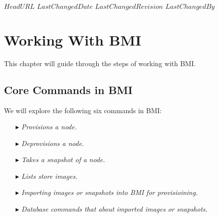 \svnidlong
{$HeadURL$}
{$LastChangedDate$}
{$LastChangedRevision$}
{$LastChangedBy$}

\chapter{Working With BMI}

\begin{introduction}
  This chapter will guide through the steps of working with BMI.
\end{introduction}

\section{Core Commands in BMI}

We will explore the following six commands in BMI: \\

\begin{itemize}
\item[\index{bmi pro}\code{pro }$\blacktriangleright$\hspace{-12mm}] \hspace{10mm}\emph{Provisions a node.}
\item[\index{bmi dpro}\code{dpro }$\blacktriangleright$\hspace{-12mm}] \hspace{10mm}\emph{Deprovisions a node.}
\item[\index{bmi snap}\code{snap }$\blacktriangleright$\hspace{-12mm}] \hspace{10mm}\emph{Takes a snapshot of a node.}
\item[\index{bmi ls}\code{ls }$\blacktriangleright$\hspace{-12mm}] \hspace{10mm}\emph{Lists store images.}
\item[\index{bmi ls}\code{import }$\blacktriangleright$\hspace{-12mm}] \hspace{10mm}\emph{Importing images or snapshots into BMI for provisioining.}
\item[\index{bmi db}\code{db }$\blacktriangleright$\hspace{-12mm}] \hspace{10mm}\emph{Database commands that about imported images or snapshots.} \\
\end{itemize}

